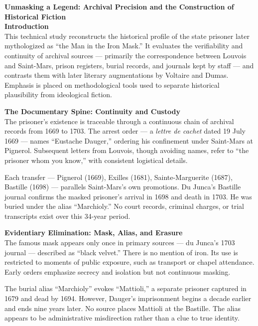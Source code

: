 \begin{technical}
{\Large\textbf{Unmasking a Legend: Archival Precision and the Construction of Historical Fiction}}\\[0.7em]

\textbf{Introduction}\\[0.5em]
This technical study reconstructs the historical profile of the state prisoner later mythologized as “the Man in the Iron Mask.” It evaluates the verifiability and continuity of archival sources — primarily the correspondence between Louvois and Saint-Mars, prison registers, burial records, and journals kept by staff — and contrasts them with later literary augmentations by Voltaire and Dumas. Emphasis is placed on methodological tools used to separate historical plausibility from ideological fiction.

\textbf{The Documentary Spine: Continuity and Custody}\\[0.5em]
The prisoner’s existence is traceable through a continuous chain of archival records from 1669 to 1703. The arrest order — a \textit{lettre de cachet} dated 19 July 1669 — names “Eustache Dauger,” ordering his confinement under Saint-Mars at Pignerol. Subsequent letters from Louvois, though avoiding names, refer to “the prisoner whom you know,” with consistent logistical details.

Each transfer — Pignerol (1669), Exilles (1681), Sainte-Marguerite (1687), Bastille (1698) — parallels Saint-Mars’s own promotions. Du Junca’s Bastille journal confirms the masked prisoner’s arrival in 1698 and death in 1703. He was buried under the alias “Marchioly.” No court records, criminal charges, or trial transcripts exist over this 34-year period.

\textbf{Evidentiary Elimination: Mask, Alias, and Erasure}\\[0.5em]
The famous mask appears only once in primary sources — du Junca’s 1703 journal — described as “black velvet.” There is no mention of iron. Its use is restricted to moments of public exposure, such as transport or chapel attendance. Early orders emphasize secrecy and isolation but not continuous masking.

The burial alias “Marchioly” evokes “Mattioli,” a separate prisoner captured in 1679 and dead by 1694. However, Dauger’s imprisonment begins a decade earlier and ends nine years later. No source places Mattioli at the Bastille. The alias appears to be administrative misdirection rather than a clue to true identity.


\end{technical}
